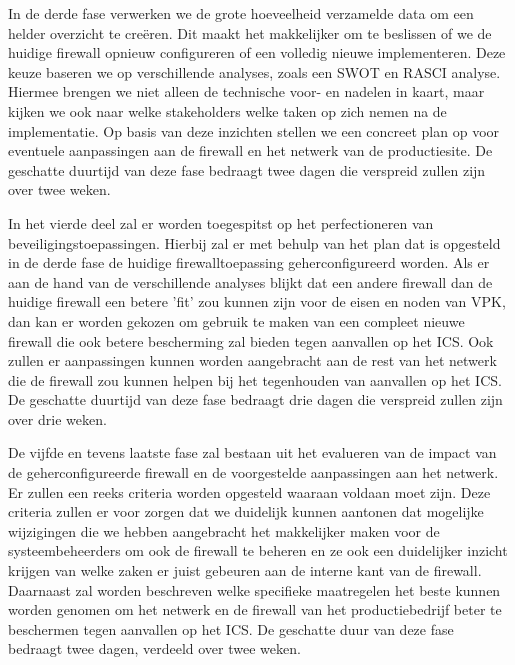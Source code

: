 \vspace{5mm}
In de derde fase verwerken we de grote hoeveelheid verzamelde data om een helder overzicht te creëren. Dit maakt het makkelijker om te beslissen of we de huidige firewall opnieuw configureren of een volledig nieuwe implementeren. Deze keuze baseren we op verschillende analyses, zoals een SWOT en RASCI analyse. Hiermee brengen we niet alleen de technische voor- en nadelen in kaart, maar kijken we ook naar welke stakeholders welke taken op zich nemen na de implementatie. Op basis van deze inzichten stellen we een concreet plan op voor eventuele aanpassingen aan de firewall en het netwerk van de productiesite. De geschatte duurtijd van deze fase bedraagt twee dagen die verspreid zullen zijn over twee weken.

\vspace{5mm}
In het vierde deel zal er worden toegespitst op het perfectioneren van beveiligingstoepassingen. Hierbij zal er met behulp van het plan dat is opgesteld in de derde fase de huidige firewalltoepassing geherconfigureerd worden. Als er aan de hand van de verschillende analyses blijkt dat een andere firewall dan de huidige firewall een betere 'fit' zou kunnen zijn voor de eisen en noden van VPK, dan kan er worden gekozen om gebruik te maken van een compleet nieuwe firewall die ook betere bescherming zal bieden tegen aanvallen op het ICS. Ook zullen er aanpassingen kunnen worden aangebracht aan de rest van het netwerk die de firewall zou kunnen helpen bij het tegenhouden van aanvallen op het ICS. De geschatte duurtijd van deze fase bedraagt drie dagen die verspreid zullen zijn over drie weken.

\vspace{5mm}
De vijfde en tevens laatste fase zal bestaan uit het evalueren van de impact van de geherconfigureerde firewall en de voorgestelde aanpassingen aan het netwerk. Er zullen een reeks criteria worden opgesteld waaraan voldaan moet zijn. Deze criteria zullen er voor zorgen dat we duidelijk kunnen aantonen dat mogelijke wijzigingen die we hebben aangebracht het makkelijker maken voor de systeembeheerders om ook de firewall te beheren en ze ook een duidelijker inzicht krijgen van welke zaken er juist gebeuren aan de interne kant van de firewall. Daarnaast zal worden beschreven welke specifieke maatregelen het beste kunnen worden genomen om het netwerk en de firewall van het productiebedrijf beter te beschermen tegen aanvallen op het ICS. De geschatte duur van deze fase bedraagt twee dagen, verdeeld over twee weken.  

